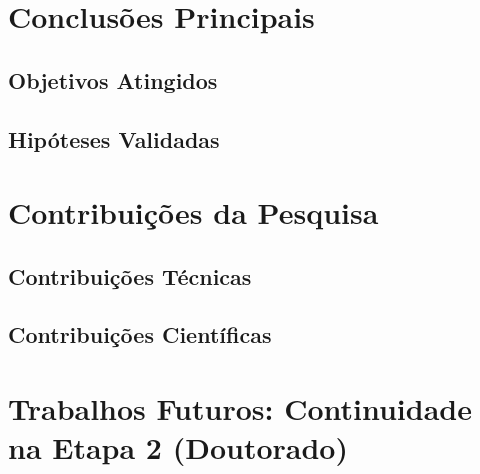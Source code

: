 
\section{Conclusões Principais}


\subsection{Objetivos Atingidos}


\subsection{Hipóteses Validadas}


\section{Contribuições da Pesquisa}


\subsection{Contribuições Técnicas}


\subsection{Contribuições Científicas}


\section{Trabalhos Futuros: Continuidade na Etapa 2 (Doutorado)}

